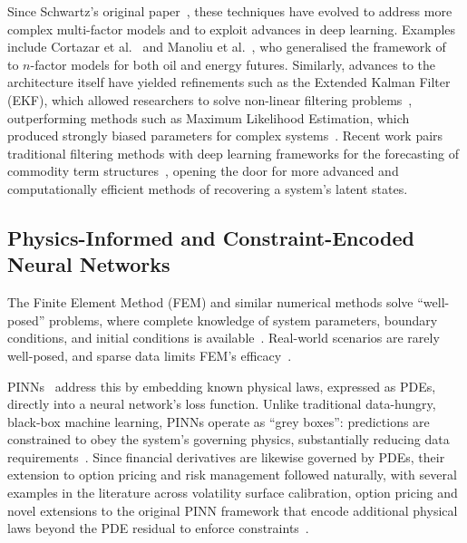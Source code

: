 \documentclass[sigconf, authorversion=true, nonacm=true]{acmart}
\begin{document}
Since Schwartz's original paper~\cite{Schwartz1997TheHedging}, these techniques have evolved to address more complex multi-factor models and to exploit advances in deep learning. Examples include Cortazar et al.~\cite{cortazar2006n} and Manoliu et al.~\cite{manoliu2002energy}, who generalised the framework of~\cite{schwartz2000short} to $n$-factor models for both oil and energy futures. Similarly, advances to the architecture itself have yielded refinements such as the Extended Kalman Filter (EKF), which allowed researchers to solve non-linear filtering problems~\cite{ewald2019calibration}, outperforming methods such as Maximum Likelihood Estimation, which produced strongly biased parameters for complex systems~\cite{Liu2009No-ArbitrageStructures, duffee2012estimation}. Recent work pairs traditional filtering methods with deep learning frameworks for the forecasting of commodity term structures~\cite{figueiredo2023forecasting}, opening the door for more advanced and computationally efficient methods of recovering a system's latent states.

\subsection{Physics-Informed and Constraint-Encoded Neural Networks}
\label{sec:lit_pinns}
\label{sec:lit_wamol}

The Finite Element Method (FEM) and similar numerical methods solve ``well-posed'' problems, where complete knowledge of system parameters, boundary conditions, and initial conditions is available~\cite{Toscano2024FromLearning}. Real-world scenarios are rarely well-posed, and sparse data limits FEM's efficacy~\cite{Toscano2024FromLearning}.

PINNs~\cite{Raissi2019Physics-informedEquations} address this by embedding known physical laws, expressed as PDEs, directly into a neural network's loss function. Unlike traditional data-hungry, black-box machine learning, PINNs operate as ``grey boxes'': predictions are constrained to obey the system's governing physics, substantially reducing data requirements~\cite{Raissi2019Physics-informedEquations, Toscano2024FromLearning}. Since financial derivatives are likewise governed by PDEs, their extension to option pricing and risk management followed naturally, with several examples in the literature across volatility surface calibration, option pricing and novel extensions to the original PINN framework that encode additional physical laws beyond the PDE residual to enforce constraints~\cite{Hoshisashi2024Whack-a-moleSurface, Hainaut2024OptionNetworks, Hoshisashi2024Physics-InformedPDEs}.
\end{document}
